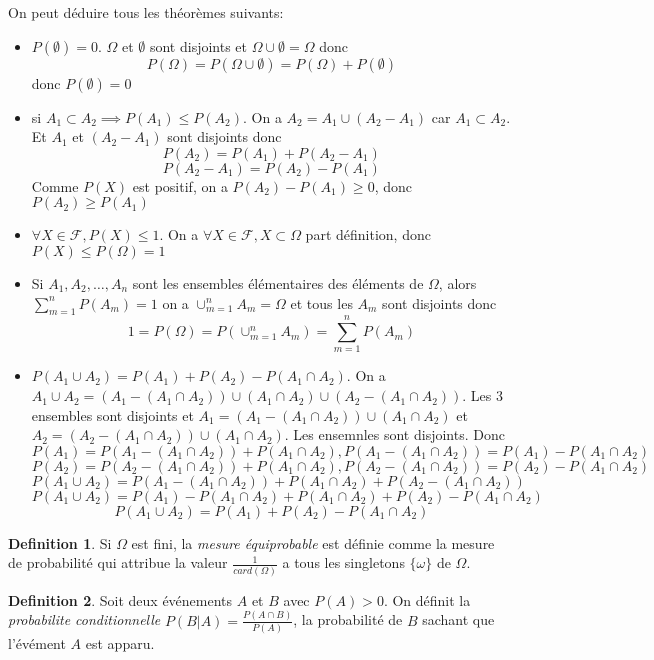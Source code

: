 \documentclass[]{book}
\theoremstyle{definition}
\newtheorem{defn}{Definition}
\begin{document}
On peut d\'eduire tous les th\'eor\`emes suivants:
\begin{itemize}
\item $P(\emptyset) = 0$. $\Omega$ et $\emptyset$ sont disjoints et $\Omega \cup \emptyset = \Omega$ donc
$$P(\Omega) = P(\Omega \cup \emptyset) = P(\Omega) + P(\emptyset)$$ 
donc $P(\emptyset) = 0$
\item si $A_1 \subset A_2 \implies P(A_1) \leq P(A_2)$. On a $A_2 = A_1 \cup (A_2-A_1)$ car $A_1 \subset A_2$. Et $A_1$ et $(A_2 - A_1)$ sont disjoints donc
$$P(A_2) = P(A_1) + P(A_2-A_1)$$
$$P(A_2-A_1) = P(A_2) - P(A_1)$$
Comme $P(X)$ est positif, on a $P(A_2) - P(A_1) \geq 0$, donc $P(A_2) \geq P(A_1)$
\item $\forall X \in \mathscr{F}, P(X) \leq 1$. On a $\forall X \in \mathscr{F}, X \subset \Omega$ part d\'efinition, donc $P(X) \leq P(\Omega) = 1$
\item Si $A_1, A_2, \ldots, A_n$ sont les ensembles \'el\'ementaires des \'el\'ements de $\Omega$, alors $\sum_{m=1}^{n} P(A_m) = 1$ on a $\cup_{m=1}^{n} A_m = \Omega$ et tous les $A_m$ sont disjoints donc 
$$1 = P(\Omega) =  P(\cup_{m=1}^{n} A_m) = \sum_{m=1}^{n} P(A_m)$$
\item $P(A_1 \cup A_2) = P(A_1) + P(A_2) - P(A_1 \cap A_2)$. On a $A_1 \cup A_2 = (A_1 - (A_1 \cap A_2)) \cup  (A_1 \cap A_2) \cup (A_2 - (A_1 \cap A_2))$. Les 3 ensembles sont disjoints et $A_1 =  (A_1 - (A_1 \cap A_2)) \cup  (A_1 \cap A_2)$ et $A_2 = (A_2 - (A_1 \cap A_2)) \cup  (A_1 \cap A_2)$. Les ensemnles sont disjoints. Donc
$$P(A_1) = P(A_1 - (A_1 \cap A_2)) + P(A_1 \cap A_2), P(A_1 - (A_1 \cap A_2)) = P(A_1) - P(A_1 \cap A_2)$$ 
$$P(A_2) = P(A_2 - (A_1 \cap A_2)) + P(A_1 \cap A_2), P(A_2 - (A_1 \cap A_2)) = P(A_2) - P(A_1 \cap A_2)$$
$$P(A_1 \cup A_2) = P(A_1 - (A_1 \cap A_2)) +  P(A_1 \cap A_2) +P(A_2 - (A_1 \cap A_2))$$
$$P(A_1 \cup A_2) = P(A_1) - P(A_1 \cap A_2) + P(A_1 \cap A_2) + P(A_2) - P(A_1 \cap A_2)$$ 
$$P(A_1 \cup A_2) = P(A_1) + P(A_2) - P(A_1 \cap A_2)$$ 
\end{itemize}


\begin{defn}
Si $\Omega$ est fini, la \emph{mesure \'equiprobable} est d\'efinie comme la mesure de probabilit\'e qui attribue la valeur $\frac{1}{card(\Omega)}$ a tous les singletons $\{\omega\}$ de $\Omega$.  
\end{defn}

\begin{defn}
Soit deux \'ev\'enements $A$ et $B$ avec $P(A) > 0$. On d\'efinit la \emph{probabilite conditionnelle} $P(B|A) = \frac{P(A \cap B)}{P(A)}$, la probabilit\'e de $B$ sachant que l'\'ev\'ement $A$ est apparu.  
\end{defn}
\end{document}
